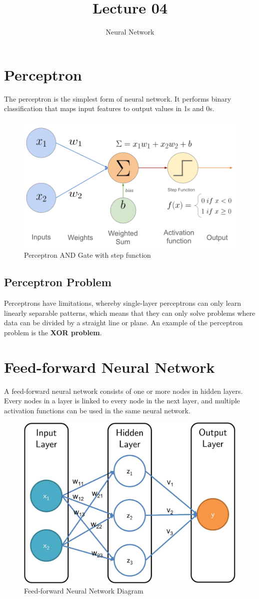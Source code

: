 \documentclass[12pt]{article}
\title{Lecture 04}
\author{Neural Network}
\begin{document}
\maketitle{}

\section{Perceptron}
The perceptron is the simplest form of neural network. It performs binary classification that maps input features to output values in 1s and 0s. 

\begin{figure}[h]
\centering
  \includegraphics[width=0.5\linewidth]{images/lecture_04/img_1.png}
  \caption{Perceptron AND Gate with step function \cite{perceptronImage}}
  \label{fig:img_1}
\end{figure}

\subsection{Perceptron Problem}
Perceptrons have limitations, whereby single-layer perceptrons can only learn linearly separable patterns, which means that they can only solve problems where data can be divided by a straight line or plane. An example of the perceptron problem is the \textbf{XOR problem}.

\newpage
\section{Feed-forward Neural Network}
A feed-forward neural network consists of one or more nodes in hidden layers. Every nodes in a layer is linked to every node in the next layer, and multiple activation functions can be used in the same neural network.

\begin{figure}[h]
\centering
  \includegraphics[width=0.5\linewidth]{images/lecture_04/img_2.png}
  \caption{Feed-forward Neural Network Diagram}
  \label{fig:img_2}
\end{figure}
\end{document}

